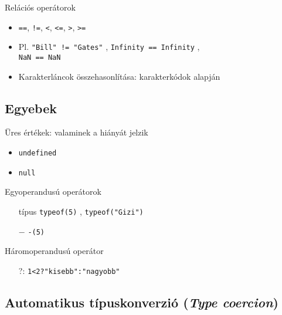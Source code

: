 \begin{frame}
    Relációs operátorok
    \begin{itemize}
        \item \texttt{==}, \texttt{!=}, \texttt{<}, \texttt{<=}, \texttt{>}, \texttt{>=} 
        \item Pl. \texttt{"Bill" != "Gates"} , \texttt{Infinity == Infinity} , \\  \texttt{NaN == NaN} 
        \item Karakterláncok összehasonlítása: karakterkódok alapján
    \end{itemize}
\end{frame}

\subsection{Egyebek}

\begin{frame}
    Üres értékek: valaminek a hiányát jelzik
    \begin{itemize}
        \item \texttt{undefined}
        \item \texttt{null}
    \end{itemize}
    \vfill
    Egyoperandusú operátorok
    \begin{itemize}
        \item[típus] \texttt{typeof(5)} , \texttt{typeof("Gizi")} 
        \item[$-$] \texttt{-(5)} 
    \end{itemize}
    \vfill
    Háromoperandusú operátor
    \begin{itemize}
        \item[?:] \texttt{1<2?"kisebb":"nagyobb"} 
    \end{itemize}
\end{frame}

\subsection{Automatikus típuskonverzió (\emph{Type coercion})}

